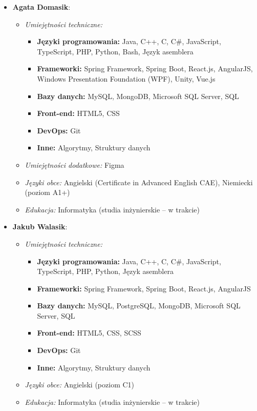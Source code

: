 \documentclass[12pt,a4paper,colorlinks=true,linkcolor=NavyBlue,citecolor=red,urlcolor=NavyBlue]{book}
\begin{document}
\begin{itemize}
    \item \textbf{Agata Domasik}:
    \begin{itemize}
        \item \textit{Umiejętności techniczne:} 
        \begin{itemize}
            \item \textbf{Języki programowania:} Java, C++, C, C\#, JavaScript, TypeScript, PHP, Python, Bash, Język asemblera
            \item \textbf{Frameworki:} Spring Framework, Spring Boot, React.js, AngularJS, Windows Presentation Foundation (WPF), Unity, Vue.js
            \item \textbf{Bazy danych:} MySQL, MongoDB, Microsoft SQL Server, SQL
            \item \textbf{Front-end:} HTML5, CSS
            \item \textbf{DevOps:} Git
            \item \textbf{Inne:} Algorytmy, Struktury danych
        \end{itemize}
        \item \textit{Umiejętności dodatkowe:} Figma
        \item \textit{Języki obce:} Angielski (Certificate in Advanced English CAE), Niemiecki (poziom A1+)
        \item \textit{Edukacja:} Informatyka (studia inżynierskie – w trakcie)
    \end{itemize}
    
    \item \textbf{Jakub Walasik}:
    \begin{itemize}
        \item \textit{Umiejętności techniczne:} 
        \begin{itemize}
            \item \textbf{Języki programowania:} Java, C++, C, C\#, JavaScript, TypeScript, PHP, Python, Język asemblera
            \item \textbf{Frameworki:} Spring Framework, Spring Boot, React.js, AngularJS
            \item \textbf{Bazy danych:} MySQL, PostgreSQL, MongoDB, Microsoft SQL Server, SQL
            \item \textbf{Front-end:} HTML5, CSS, SCSS
            \item \textbf{DevOps:} Git
            \item \textbf{Inne:} Algorytmy, Struktury danych
        \end{itemize}
        \item \textit{Języki obce:} Angielski (poziom C1)
        \item \textit{Edukacja:} Informatyka (studia inżynierskie – w trakcie)
    \end{itemize}
    

\end{itemize}
\end{document}

